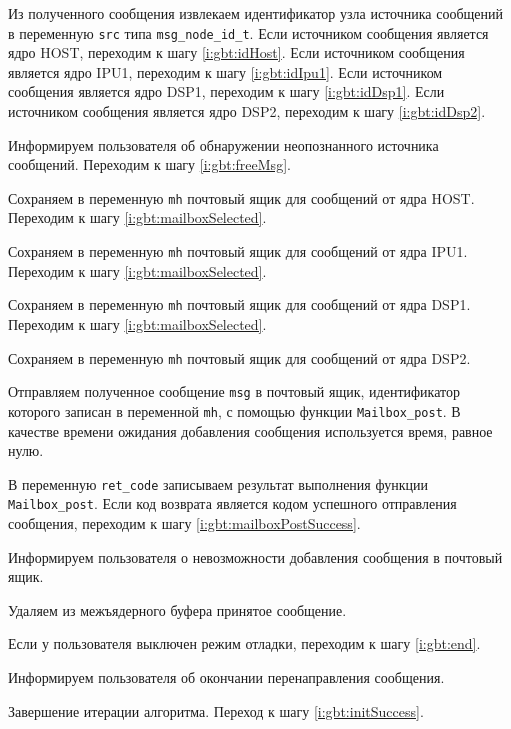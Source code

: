 \begin{enumerate_step}
    \item Из полученного сообщения извлекаем идентификатор
    узла источника сообщений в переменную \verb|src| типа \verb|msg_node_id_t|.
    Если источником сообщения является ядро HOST, переходим к шагу
    \ref{i:gbt:idHost}. Если источником сообщения является ядро IPU1, переходим
    к шагу \ref{i:gbt:idIpu1}. Если источником сообщения является ядро DSP1,
    переходим к шагу \ref{i:gbt:idDsp1}. Если источником сообщения является
    ядро DSP2, переходим к шагу \ref{i:gbt:idDsp2}.
    \item Информируем пользователя об обнаружении неопознанного
    источника сообщений. Переходим к шагу \ref{i:gbt:freeMsg}.
    \item \label{i:gbt:idHost} Сохраняем в переменную \verb|mh| почтовый ящик
    для сообщений от ядра HOST. Переходим к шагу \ref{i:gbt:mailboxSelected}.
    \item \label{i:gbt:idIpu1} Сохраняем в переменную \verb|mh| почтовый ящик
    для сообщений от ядра IPU1. Переходим к шагу \ref{i:gbt:mailboxSelected}.
    \item \label{i:gbt:idDsp1} Сохраняем в переменную \verb|mh| почтовый ящик
    для сообщений от ядра DSP1. Переходим к шагу \ref{i:gbt:mailboxSelected}.
    \item \label{i:gbt:idDsp2} Сохраняем в переменную \verb|mh| почтовый ящик
    для сообщений от ядра DSP2.
    \item \label{i:gbt:mailboxSelected} Отправляем полученное сообщение \verb|msg|
    в почтовый ящик, идентификатор которого записан в переменной \verb|mh|,
    с помощью функции \verb|Mailbox_post|. В качестве времени ожидания добавления
    сообщения используется время, равное нулю.
    \item В переменную \verb|ret_code| записываем результат выполнения функции
    \verb|Mailbox_post|. Если код возврата является кодом успешного
    отправления сообщения, переходим к шагу \ref{i:gbt:mailboxPostSuccess}.
    \item Информируем пользователя о невозможности добавления сообщения в почтовый
    ящик.
    \item \label{i:gbt:freeMsg} Удаляем из межъядерного буфера принятое сообщение.
    \item \label{i:gbt:mailboxPostSuccess} Если у пользователя выключен режим
    отладки, переходим к шагу \ref{i:gbt:end}.
    \item Информируем пользователя об окончании перенаправления сообщения.
    \item \label{i:gbt:end} Завершение итерации алгоритма. Переход к шагу
    \ref{i:gbt:initSuccess}.
\end{enumerate_step}

